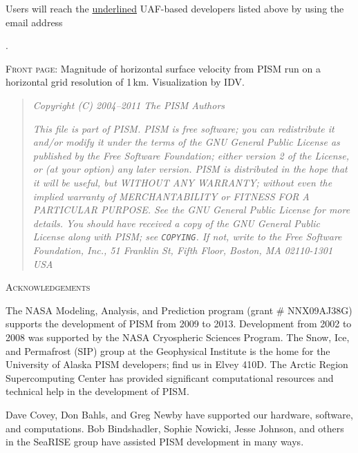 \documentclass[titlepage,letterpaper,final]{scrartcl}
\begin{document}
\bigskip\bigskip
Users will reach the \underline{underlined} UAF-based developers listed above by using the email address

\centerline{ \PISMEMAIL.  }

\bigskip\bigskip
\noindent \textsc{Front page}:  Magnitude of horizontal surface velocity from PISM run on a horizontal grid resolution of 1\,km.  Visualization by IDV.

\vfill

\newpage
\vspace{0.2in}
\begin{quote}
\textsl{Copyright (C) 2004--2011 The PISM Authors}
\medskip

\noindent \textsl{This file is part of PISM.  PISM is free software; you can redistribute it and/or modify it under the terms of the GNU General Public License as published by the Free Software Foundation; either version 2 of the License, or (at your option) any later version.  PISM is distributed in the hope that it will be useful, but WITHOUT ANY WARRANTY; without even the implied warranty of MERCHANTABILITY or FITNESS FOR A PARTICULAR PURPOSE.  See the GNU General Public License for more details.  You should have received a copy of the GNU General Public License along with PISM; see \emph{\texttt{COPYING}}.  If not, write to the Free Software Foundation, Inc., 51 Franklin St, Fifth Floor, Boston, MA  02110-1301 USA}
\end{quote}
\vspace{0.5in}

\centerline{\textsc{Acknowledgements}}
\bigskip

\small
The NASA Modeling, Analysis, and Prediction program (grant \# NNX09AJ38G) supports the development of PISM from 2009 to 2013.  Development from 2002 to 2008 was supported by the NASA Cryospheric Sciences Program.  The Snow, Ice, and Permafrost (SIP) group at the Geophysical Institute is the home for the University of Alaska PISM developers; find us in Elvey 410D.  The Arctic Region Supercomputing Center has provided significant computational resources and technical help in the development of PISM.

Dave Covey, Don Bahls, and Greg Newby have supported our hardware, software, and computations.  Bob Bindshadler, Sophie Nowicki, Jesse Johnson, and others in the SeaRISE group have assisted PISM development in many ways.  
\end{document}
